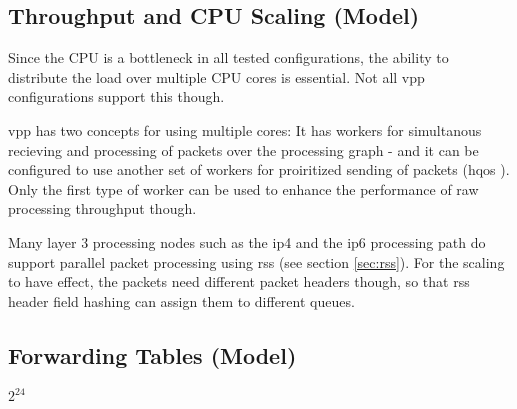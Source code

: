 \subsection{Throughput and CPU Scaling (Model)}

Since the CPU is a bottleneck in all tested configurations, the
ability to distribute the load over multiple CPU cores is
essential. Not all \Ac{vpp} configurations support this though.

\Ac{vpp} has two concepts for using multiple cores: It has workers for
simultanous recieving and processing of packets over the processing
graph - and it can be configured to use another set of workers for
proiritized sending of packets (\Ac{hqos} \cite{vppdocs:qos}
\cite{vppdocs:hqosplacement}). Only the first type of worker can be
used to enhance the performance of raw processing throughput though.

Many layer 3 processing nodes such as the \Ac{ip4} and the \Ac{ip6}
processing path do support parallel packet processing using \Ac{rss}
(see section \ref{sec:rss}). For the scaling to have effect, the
packets need different packet headers though, so that \Ac{rss} header
field hashing can assign them to different queues.







\subsection{Forwarding Tables (Model)}

$2^{24}$


